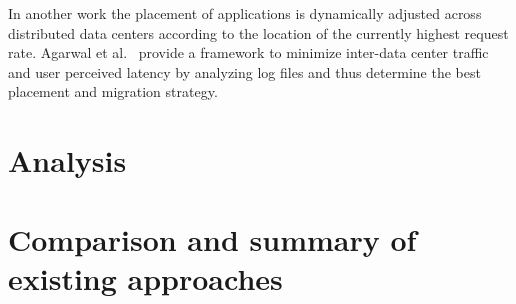 In another work \cite{malet2010resource} the placement of applications is dynamically adjusted across distributed data centers according to the location of the currently highest request rate. Agarwal et al.~\cite{agarwal2010volley} provide a framework to minimize inter-data center traffic and user perceived latency by analyzing log files and thus determine the best placement and migration strategy. 



\section{Analysis}


\section{Comparison and summary of existing approaches}

